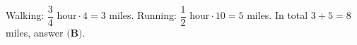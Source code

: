 Walking: $\dfrac34\text{ hour}\cdot4=3$ miles. Running: $\dfrac12\text{ hour}\cdot10=5$ miles. In total $3+5=\boxed{8}$ miles, answer $\textbf{(B)}$.
